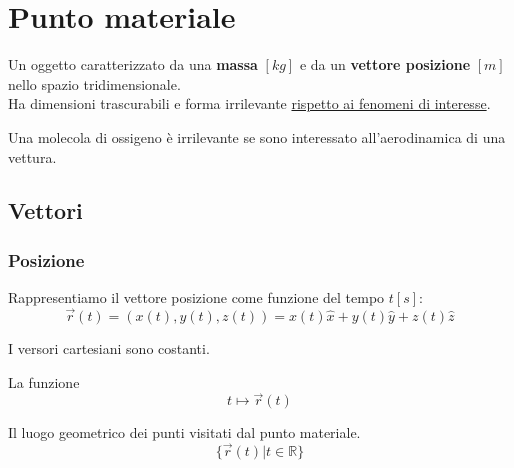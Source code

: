\newpage
\section{Punto materiale}
\begin{definition}
	Un oggetto caratterizzato da una \textbf{massa} $[kg]$ e da un \textbf{vettore posizione} $[m]$ nello spazio tridimensionale.\\ Ha dimensioni trascurabili e forma irrilevante \underline{rispetto ai fenomeni di interesse}.
\end{definition}

\begin{example}
	Una molecola di ossigeno è irrilevante se sono interessato all'aerodinamica di una vettura.
\end{example}

\subsection{Vettori}
\subsubsection{Posizione}
Rappresentiamo il vettore posizione come funzione del tempo $t[s]$:
\begin{equation}
	\vec{r}(t) = (x(t), y(t), z(t)) = x(t)\widehat{x} + y(t)\widehat{y}+z(t)\widehat{z}
\end{equation}
\begin{observation}
	I versori cartesiani sono costanti.
\end{observation}

\begin{definition}
	La funzione
	\begin{equation}
		t \mapsto \vec{r}(t)
	\end{equation}
\end{definition}

\begin{definition}[Traiettoria]
	Il luogo geometrico dei punti visitati dal punto materiale.
	\begin{equation}
		\{\vec{r}(t) \vert t\in \mathbb{R}\}
	\end{equation}
\end{definition}


